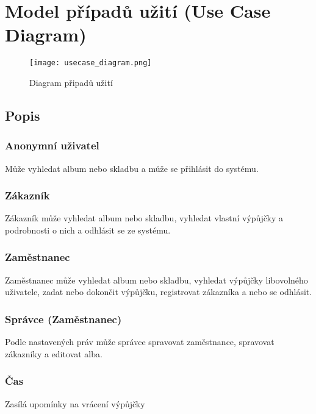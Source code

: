 \section{Model případů užití (Use Case Diagram)}

\begin{figure}[H] 
  \centering
  \texttt{[image: usecase\_diagram.png]}
  \caption{Diagram připadů užití}
\end{figure}


\subsection{Popis}

\subsubsection{Anonymní uživatel}
Může vyhledat album nebo skladbu a může se přihlásit do systému.

\subsubsection{Zákazník}
Zákazník může vyhledat album nebo skladbu, vyhledat vlastní výpůjčky a podrobnosti o nich a odhlásit se ze systému.

\subsubsection{Zaměstnanec}
Zaměstnanec může vyhledat album nebo skladbu, vyhledat výpůjčky libovolného uživatele, zadat nebo dokončit výpůjčku, registrovat zákazníka a nebo se odhlásit.

\subsubsection{Správce (Zaměstnanec)}
Podle nastavených práv může správce spravovat zaměstnance, spravovat zákazníky a editovat alba.

\subsubsection{Čas}
Zasílá upomínky na vrácení výpůjčky
